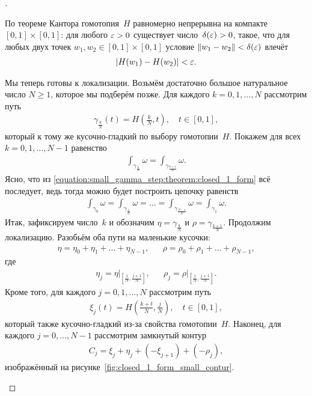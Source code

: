 \documentclass[../complex-analysis.tex]{subfiles}
\begin{document}
\begin{proof}[]
\begin{itemize}
   По теореме Кантора гомотопия~$H$ равномерно непрерывна на компакте~$[0,1]\times[0,1]$: для любого $\varepsilon > 0$ существует число~$\delta(\varepsilon) > 0$, такое, что для любых двух точек $w_1,w_2 \in [0,1] \times [0,1]$ условие $\left\| w_1 - w_2 \right\| < \delta(\varepsilon)$ влечёт
   \begin{align*}
    \left| H(w_1)-H(w_2) \right| < \varepsilon.
   \end{align*}

   Мы теперь готовы к локализации. Возьмём достаточно большое натуральное число $ N \geqslant 1 $, которое мы подберём позже. Для каждого $ k = 0, 1, \ldots, N $ рассмотрим путь
   \begin{align*}
    \gamma_{\frac{k}{N}}(t) = H\left(\frac{k}{N}, t\right), \quad t \in [0,1],
   \end{align*} который к тому же кусочно-гладкий по выбору гомотопии~$ H $. Покажем для всех $ k = 0,1,\ldots,N-1 $ равенство
   \begin{align}
    \label{equation:small_gamma_step:theorem:closed_1_form}
    \int_{\gamma_{\frac{k}{N}}}  \omega = \int_{\gamma_{\frac{k+1}{N}}}  \omega.
   \end{align} Ясно, что из \eqref{equation:small_gamma_step:theorem:closed_1_form} всё последует, ведь тогда можно будет построить цепочку равенств
   \begin{align*}
    \int_{\gamma_0}\omega = \int_{\gamma_{\frac{1}{N}}} \omega = \ldots = \int_{\gamma_{\frac{N-1}{N}}} \omega  = \int_{\gamma_{1}}\omega.
   \end{align*} Итак, зафиксируем число~$k$ и обозначим $\eta = \gamma_{\frac{k}{N}}$  и $\rho = \gamma_{\frac{k+1}{N}}$. Продолжим локализацию. Разобьём оба пути на маленькие кусочки:
   \begin{align*}
    \eta = \eta_0 + \eta_1 + \ldots + \eta_{N-1}, & &\rho = \rho_0 + \rho_1 + \ldots + \rho_{N-1},
   \end{align*} где
   \begin{align*}
    \eta_j = \eta \rvert_{\left[\frac{j}{N},\frac{j+1}{N}\right]  }, & &\rho_j = \rho \rvert_{\left[\frac{j}{N},\frac{j+1}{N}\right]  }.
   \end{align*} Кроме того, для каждого $ j = 0,1,\ldots,N $ рассмотрим путь
   \begin{align*}
    \xi_j(t) = H \left( \frac{k + t}{N}, \frac{j}{N} \right), \quad t \in [0,1],
   \end{align*} который также кусочно-гладкий из-за свойства гомотопии~$ H $. Наконец, для каждого $ j = 0,\ldots,N-1 $ рассмотрим замкнутый контур
   \begin{align*}
    C_j = \xi_j+\eta_j+(-\xi_{j+1})+(-\rho_j),
   \end{align*} изображённый на рисунке~\ref{fig:closed_1_form_small_contur}.


\end{itemize}
\end{proof}
\end{document}
